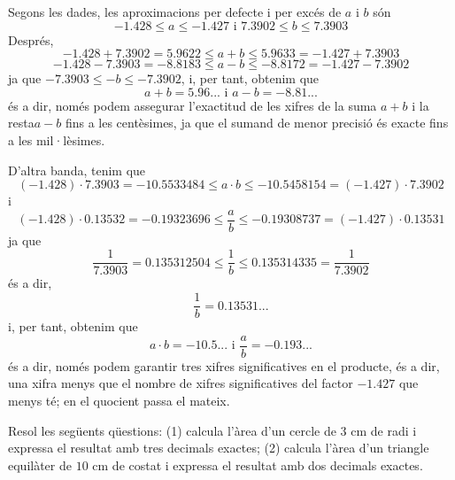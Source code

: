 \begin{solucio}
Segons les dades, les aproximacions per defecte i per excés de $a$ i $b$
són%
\begin{equation*}
-1.428\leq a\leq -1.427\text{ \ \ i \ \ }7.3902\leq b\leq 7.3903
\end{equation*}%
Després,%
\begin{equation*}
-1.428+7.3902=5.9622\leq a+b\leq 5.9633=-1.427+7.3903
\end{equation*}%
\begin{equation*}
-1.428-7.3903=-8.8183\leq a-b\leq -8.8172=-1.427-7.3902
\end{equation*}%
ja que $-7.3903\leq -b\leq -7.3902$, i, per tant, obtenim que%
\begin{equation*}
a+b=5.96...\text{ \ \ i \ \ }a-b=-8.81...
\end{equation*}%
és a dir, només podem assegurar l’exactitud de les xifres de la suma $%
a+b$ i la resta$a-b$ fins a les centèsimes, ja que el sumand de menor
precisió és exacte fins a les mil·lèsimes.

D’altra banda, tenim que%
\begin{equation*}
\left( -1.428\right) \cdot 7.3903=-10.5533484\leq a\cdot b\leq
-10.5458154=\left( -1.427\right) \cdot 7.3902
\end{equation*}%
i%
\begin{equation*}
\left( -1.428\right) \cdot 0.13532=-0.19323696\leq \frac{a}{b}\leq
-0.19308737=\left( -1.427\right) \cdot 0.13531
\end{equation*}%
ja que 
\begin{equation*}
\frac{1}{7.3903}=0.135312504\leq \frac{1}{b}\leq 0.135314335=\frac{1}{7.3902}
\end{equation*}%
és a dir,%
\begin{equation*}
\frac{1}{b}=0.13531...
\end{equation*}%
i, per tant, obtenim que%
\begin{equation*}
a\cdot b=-10.5...\text{ \ \ i \ \ }\frac{a}{b}=-0.193...
\end{equation*}%
és a dir, només podem garantir tres xifres significatives en el
producte, és a dir, una xifra menys que el nombre de xifres significatives
del factor $-1.427$ que menys té; en el quocient passa el mateix.
\end{solucio}

\begin{exercici}
Resol les següents qüestions: (1) calcula l’àrea d’un cercle de $3$ cm de radi i expressa el resultat amb tres decimals exactes;
(2) calcula l’àrea d’un triangle equilàter de $10$ cm de costat i
expressa el resultat amb dos decimals exactes.

\end{exercici}


